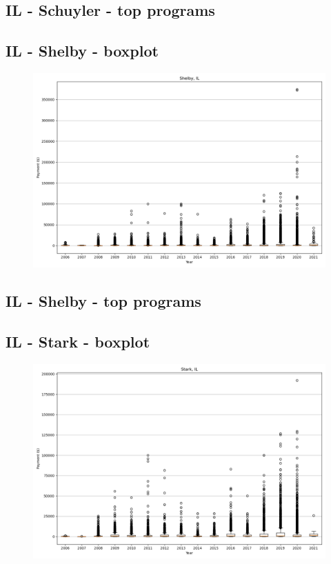 \subsection*{IL - Schuyler - top programs}

\newpage
\subsection*{IL - Shelby - boxplot}
\begin{figure}[h]
\centering
\includegraphics[width=7in]{../output/boxplots/counties/Shelby-IL_boxplot.png}
\end{figure}


\subsection*{IL - Shelby - top programs}

\newpage
\subsection*{IL - Stark - boxplot}
\begin{figure}[h]
\centering
\includegraphics[width=7in]{../output/boxplots/counties/Stark-IL_boxplot.png}
\end{figure}


